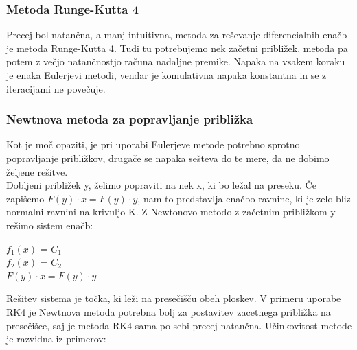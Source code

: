 \documentclass[12pt]{article}
\begin{document}
	
\subsubsection{Metoda Runge-Kutta 4}
    Precej bol natan\v{c}na, a manj intuitivna, metoda za re\v{s}evanje diferencialnih ena\v{c}b je metoda Runge-Kutta 4. Tudi tu potrebujemo nek za\v{c}etni pribli\v{z}ek, metoda pa potem z ve\v{c}jo natan\v{c}nostjo ra\v{c}una nadaljne premike. Napaka na vsakem koraku je enaka Eulerjevi metodi, vendar je komulativna napaka konstantna in se z iteracijami ne povečuje.

\subsubsection{Newtnova metoda za popravljanje pribli\v{z}ka}
    Kot je mo\v{c} opaziti, je pri uporabi Eulerjeve metode potrebno sprotno popravljanje pribli\v{z}kov, druga\v{c}e se napaka se\v{s}teva do te mere, da ne dobimo \v{z}eljene re\v{s}itve.\\
    Dobljeni pribli\v{z}ek y, \v{z}elimo popraviti na nek x, ki bo le\v{z}al na preseku. \v{C}e zapi\v{s}emo $F(y) \cdot x = F(y)\cdot y $, nam to predstavlja ena\v{c}bo ravnine, ki je zelo bliz normalni ravnini na krivuljo K. Z Newtonovo metodo z za\v{c}etnim pribli\v{z}kom y re\v{s}imo sistem ena\v{c}b:
    \begin{center}
    	$f_{1}(x)$ = $C_{1}$\\$f_{2}(x)$ = $C_{2}$\\ $F(y) \cdot x = F(y)\cdot y $
    \end{center}
    Re\v{s}itev sistema je to\v{c}ka, ki le\v{z}i na prese\v{c}i\v{s}\v{c}u obeh ploskev. V primeru uporabe RK4 je Newtnova metoda potrebna bolj za postavitev zacetnega pribli\v{z}ka na prese\v{c}i\v{sc}e, saj je metoda RK4 sama po sebi precej natan\v{c}na. U\v{c}inkovitost metode je razvidna iz primerov:
    
\end{document}
